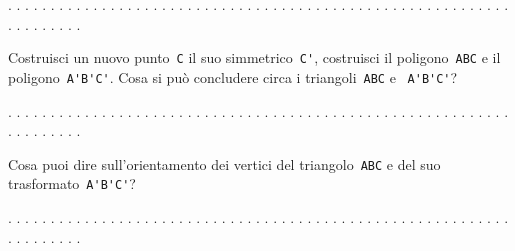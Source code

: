 . . . . . . . . . . . . . . . . . . . . . . . . . . . . . . . . . . . . . . . .
. . . . . . . . . . . . . . . . . . . . . . . . . . . .

Costruisci un nuovo punto~\lstinline{C} il suo simmetrico~\lstinline{C'},
costruisci il poligono~\lstinline{ABC} e il poligono~\lstinline{A'B'C'}.
Cosa si può concludere circa i triangoli~\lstinline{ABC} e ~\lstinline{A'B'C'}?

. . . . . . . . . . . . . . . . . . . . . . . . . . . . . . . . . . . . . . . .
. . . . . . . . . . . . . . . . . . . . . . . . . . . .

Cosa puoi dire sull'orientamento dei vertici del triangolo~\lstinline{ABC} e 
del suo trasformato~\lstinline{A'B'C'}?

. . . . . . . . . . . . . . . . . . . . . . . . . . . . . . . . . . . . . . . .
. . . . . . . . . . . . . . . . . . . . . . . . . . . .

